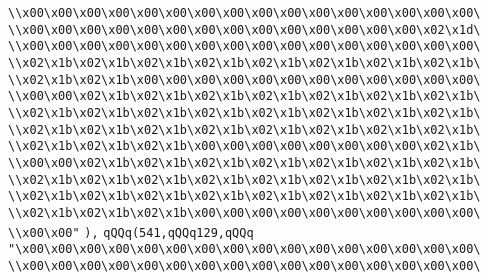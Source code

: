 \verb|\\x00\x00\x00\x00\x00\x00\x00\x00\x00\x00\x00\x00\x00\x00\x00\x00\|\newline
\verb|\\x00\x00\x00\x00\x00\x00\x00\x00\x00\x00\x00\x00\x00\x00\x02\x1d\|\newline
\verb|\\x00\x00\x00\x00\x00\x00\x00\x00\x00\x00\x00\x00\x00\x00\x00\x00\|\newline
\verb|\\x02\x1b\x02\x1b\x02\x1b\x02\x1b\x02\x1b\x02\x1b\x02\x1b\x02\x1b\|\newline
\verb|\\x02\x1b\x02\x1b\x00\x00\x00\x00\x00\x00\x00\x00\x00\x00\x00\x00\|\newline
\verb|\\x00\x00\x02\x1b\x02\x1b\x02\x1b\x02\x1b\x02\x1b\x02\x1b\x02\x1b\|\newline
\verb|\\x02\x1b\x02\x1b\x02\x1b\x02\x1b\x02\x1b\x02\x1b\x02\x1b\x02\x1b\|\newline
\verb|\\x02\x1b\x02\x1b\x02\x1b\x02\x1b\x02\x1b\x02\x1b\x02\x1b\x02\x1b\|\newline
\verb|\\x02\x1b\x02\x1b\x02\x1b\x00\x00\x00\x00\x00\x00\x00\x00\x02\x1b\|\newline
\verb|\\x00\x00\x02\x1b\x02\x1b\x02\x1b\x02\x1b\x02\x1b\x02\x1b\x02\x1b\|\newline
\verb|\\x02\x1b\x02\x1b\x02\x1b\x02\x1b\x02\x1b\x02\x1b\x02\x1b\x02\x1b\|\newline
\verb|\\x02\x1b\x02\x1b\x02\x1b\x02\x1b\x02\x1b\x02\x1b\x02\x1b\x02\x1b\|\newline
\verb|\\x02\x1b\x02\x1b\x02\x1b\x00\x00\x00\x00\x00\x00\x00\x00\x00\x00\|\newline
\verb|\\x00\x00"|\newline
\verb|),|\newline
\verb|qQQq(541,qQQq129,qQQq|\newline
\verb|"\x00\x00\x00\x00\x00\x00\x00\x00\x00\x00\x00\x00\x00\x00\x00\x00\|\newline
\verb|\\x00\x00\x00\x00\x00\x00\x00\x00\x00\x00\x00\x00\x00\x00\x00\x00\|\newline
